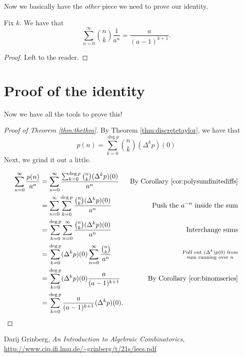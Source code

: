 \documentclass{article}
\DeclareMathOperator{\degree}{deg}
\begin{document}
Now we basically have the \textit{other} piece we need to prove our identity.

\begin{corollary}\label{cor:binomseries}
    Fix $k$.
    We have that
    \[
        \sum_{n=0}^\infty \binom{n}{k} \frac{1}{a^n} = \frac{a}{(a-1)^{k+1}}.
    \]
\end{corollary}

\begin{proof}
    Left to the reader.
\end{proof}

\section{Proof of the identity}

Now we have all the tools to prove this!

\begin{proof}[Proof of Theorem \ref{thm:thethm}]
    By Theorem \ref{thm:discretetaylor}, we have that
    \[
        p(n) = \sum_{k=0}^{\degree p}\binom{n}{k}(\Delta^k p)(0)
    \]
    Next, we grind it out a little.

    \begin{align*}
        \sum_{n=0}^\infty \frac{p(n)}{a^n} &= \sum_{n=0}^\infty \frac{\sum_{k=0}^{\degree p}\binom{n}{k}(\Delta^k p)(0)}{a^n}  & \text{By Corollary \ref{cor:polysumfinitediffs}} \\
                                           &= \sum_{n=0}^\infty \sum_{k=0}^{\degree p} \frac{\binom{n}{k}(\Delta^k p)(0)}{a^n} & \text{Push the }a^{-n}\text{ inside the sum} \\
                                           &= \sum_{k=0}^{\degree p} \sum_{n=0}^\infty \frac{\binom{n}{k}(\Delta^k p)(0)}{a^n} & \text{Interchange sums} \\
                                           &= \sum_{k=0}^{\degree p} (\Delta^k p)(0) \sum_{n=0}^\infty \frac{\binom{n}{k}}{a^n} & \substack{\text{Pull out }(\Delta^k)p(0)\text{ from}\\ \text{sum running over }n}\\
                                           &= \sum_{k=0}^{\degree p} (\Delta^k p)(0) \frac{a}{(a-1)^{k+1}} & \text{By Corollary \ref{cor:binomseries}} \\
                                           &= \sum_{k=0}^{\degree p} \frac{a}{(a-1)^{k+1}} (\Delta^k p)(0).
    \end{align*}
\end{proof}



\begin{thebibliography}{999999}
    \footnotesize\raggedright

    Darij Grinberg, \textit{An Introduction to Algebraic Combinatorics}, \url{http://www.cip.ifi.lmu.de/~grinberg/t/21s/lecs.pdf}

\end{thebibliography}
\end{document}
